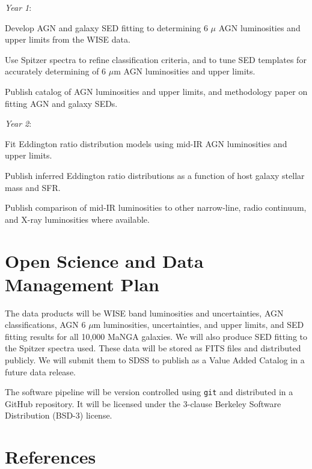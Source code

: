 \documentclass[12pt, preprint]{hacked-aastex}
\newlength{\mylen}
\newenvironment{ditemize}
{ \begin{list}{}{%
\setlength{\topsep}{0pt}%
\setlength{\partopsep}{3pt}%
\setlength{\itemsep}{1pt}\setlength{\parsep}{1pt}%
\setlength{\itemindent}{0pt}\setlength{\listparindent}{12pt}%
\setlength{\leftmargin}{24pt}\setlength{\rightmargin}{0in}%
\setlength{\labelsep}{3pt}\setlength{\labelwidth}{6pt}%
\setlength{\mylen}{3pt}
\renewcommand{\makelabel}{\makebox[\labelwidth][l]{\raisebox{\mylen}{\tiny$\bullet$}\hspace{\fill}}}}}
{\end{list}}
\begin{document}
\begin{ditemize}
\item {\it Year 1}: 
\begin{ditemize}
\item Develop AGN and galaxy SED fitting to determining 6 $\mu$ AGN luminosities and
upper limits from the WISE data.
\item Use Spitzer spectra to refine classification criteria, and to tune SED 
templates for accurately determining of 6 $\mu$m AGN luminosities and upper limits.
\item Publish catalog of AGN luminosities and upper limits, and methodology paper
on fitting AGN and galaxy SEDs.
\end{ditemize}
\item {\it Year 2}: 
\begin{ditemize}
\item Fit Eddington ratio distribution models 
using mid-IR AGN luminosities and upper limits.
\item Publish inferred  Eddington ratio distributions as a function of 
host galaxy stellar mass and SFR.
\item Publish comparison of mid-IR luminosities to other narrow-line,
radio continuum, and X-ray luminosities where available.
\end{ditemize}
\end{ditemize}

\section{Open Science and Data Management Plan\label{sec:data}}
\vspace{-6pt}

The data products will be WISE band luminosities and uncertainties, 
AGN classifications, AGN 6 $\mu$m luminosities, uncertainties, and 
upper limits, and SED fitting results for all 10,000 MaNGA galaxies. 
We will also produce SED fitting  to the Spitzer spectra used. These 
data will be stored as FITS files and distributed publicly.
We will submit them to SDSS to publish as a Value Added Catalog in a 
future data release.

The software pipeline will be version controlled using {\tt git} 
and distributed in a GitHub repository.
It will be licensed under the 3-clause Berkeley
Software Distribution (BSD-3) license.

\clearpage
\section{References}\label{sec:refs}
\end{document}
